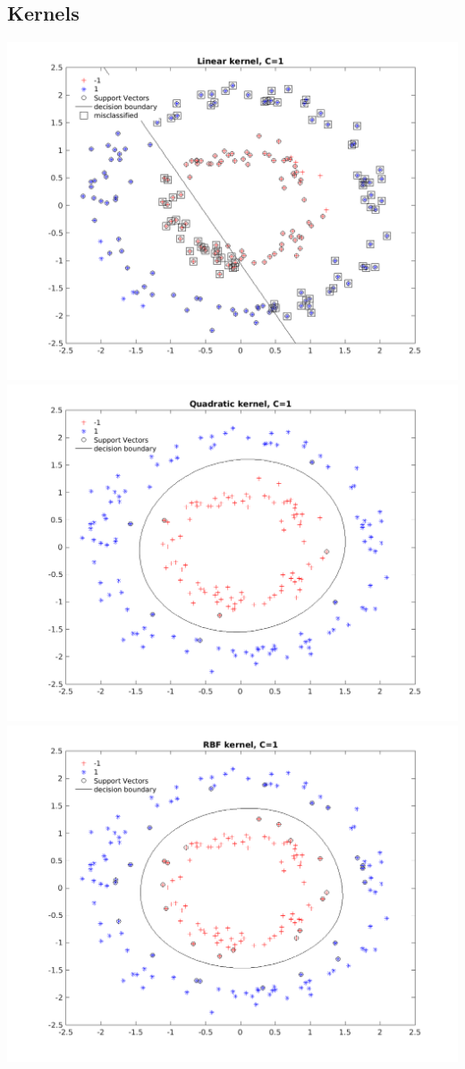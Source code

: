 \documentclass[a4paper,11pt]{article}
\begin{document}
\subsection{Kernels}
\includegraphics[width=\textwidth]{P2_2a}
\includegraphics[width=\textwidth]{P2_2b}
\includegraphics[width=\textwidth]{P2_2c}
\end{document}

